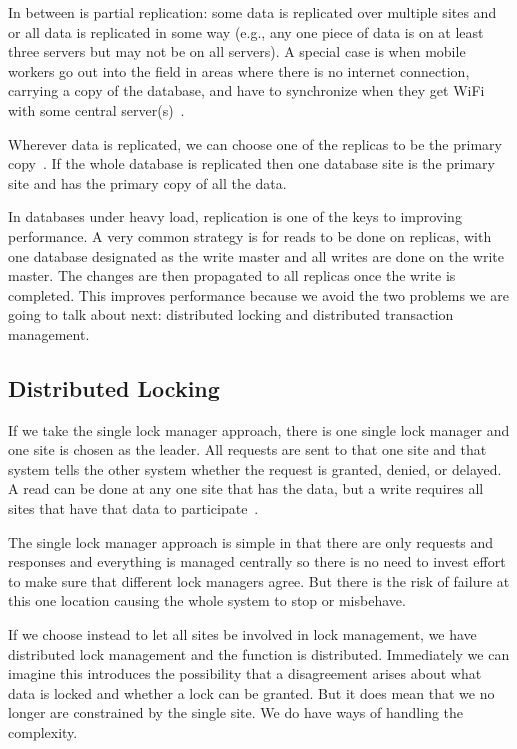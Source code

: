 \documentclass[a4paper]{report}
\begin{document}
In between is partial replication: some data is replicated over multiple sites and or all data is replicated in some way (e.g., any one piece of data is on at least three servers but may not be on all servers). A special case is when mobile workers go out into the field in areas where there is no internet connection, carrying a copy of the database, and have to synchronize when they get WiFi with some central server(s)~\cite{fds}.

Wherever data is replicated, we can choose one of the replicas to be the primary copy~\cite{dsc}. If the whole database is replicated then one database site is the primary site and has the primary copy of all the data. 

In databases under heavy load, replication is one of the keys to improving performance. A very common strategy is for reads to be done on replicas, with one database designated as the write master and all writes are done on the write master. The changes are then propagated to all replicas once the write is completed. This improves performance because we avoid the two problems we are going to talk about next: distributed locking and distributed transaction management.

\subsection*{Distributed Locking}

If we take the single lock manager approach, there is one single lock manager and one site is chosen as the leader. All requests are sent to that one site and that system tells the other system whether the request is granted, denied, or delayed. A read can be done at any one site that has the data, but a write requires all sites that have that data to participate~\cite{dsc}.

The single lock manager approach is simple in that there are only requests and responses and everything is managed centrally so there is no need to invest effort to make sure that different lock managers agree. But there is the risk of failure at this one location causing the whole system to stop or misbehave.

If we choose instead to let all sites be involved in lock management, we have distributed lock management and the function is distributed. Immediately we can imagine this introduces the possibility that a disagreement arises about what data is locked and whether a lock can be granted. But it does mean that we no longer are constrained by the single site. We do have ways of handling the complexity.
\end{document}
